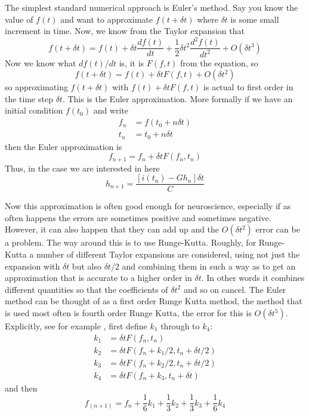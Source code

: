\documentclass[11pt,a4paper]{scrartcl}
\begin{document}
The simplest standard numerical approach is Euler's method. Say you
know the value of $f(t)$ and want to approximate $f(t+\delta t)$ where
$\delta t$ is some small increment in time. Now, we know from the
Taylor expansion that
\begin{equation}
f(t+\delta t)=f(t)+\delta t \frac{df(t)}{dt}+\frac{1}{2}\delta t^2 \frac{d^2f(t)}{dt^2}+O(\delta t^3)
\end{equation}
Now we know what $df(t)/dt$ is, it is $F(f,t)$ from the equation, so 
\begin{equation}
f(t+\delta t)=f(t)+\delta t F(f,t) + O(\delta t^2)
\end{equation}
so approximating $f(t+\delta t)$ with $f(t)+\delta t F(f,t)$ is actual
to first order in the time step $\delta t$. This is the Euler
approximation. More formally if we have an initial condition $f(t_0)$
and write
\begin{align}
f_n&=f(t_0+n\delta t)\\
t_n&=t_0+n\delta t
\end{align}
then the Euler approximation is
\begin{equation}
f_{n+1}=f_n+\delta t F(f_n,t_n)
\end{equation}
Thus, in the case we are interested in here
\begin{equation}
h_{n+1}=\frac{[i(t_n)-Gh_n]\delta t}{C}
\end{equation}

Now this approximation is often good enough for neuroscience,
especially if as often happens the errors are sometimes positive and
sometimes negative. However, it can also happen that they can add up
and the $O(\delta t^2)$ error can be a problem. The way around this is
to use Runge-Kutta. Roughly, for Runge-Kutta a number of different
Taylor expansions are considered, using not just the expansion with
$\delta t$ but also $\delta t /2$ and combining them in such a way as
to get an approximation that is accurate to a higher order in 
$\delta t$. In other words it combines different quantities so that the
coefficients of $\delta t^2$ and so on cancel. The Euler method can be
thought of as a first order Runge Kutta method, the method that is
used most often is fourth order Runge Kutta, the error for this is
$O(\delta t^5)$. Explicitly, see for example \cite{}, first define
$k_1$ through to $k_4$:
\begin{align}
k_1&=\delta t F(f_n,t_n)\\	
k_2&=\delta t F(f_n+k_1/2,t_n+\delta t/2)\\	
k_3&=\delta t F(f_n+k_2/2,t_n+\delta t/2)\\	
k_4&=\delta t F(f_n+k_3,t_n+\delta t)	
\end{align}
and then
\begin{equation}
f_(n+1)	=f_n+\frac{1}{6}k_1+\frac{1}{3}k_2+\frac{1}{3}k_3+\frac{1}{6}k_4
\end{equation}
\end{document}
